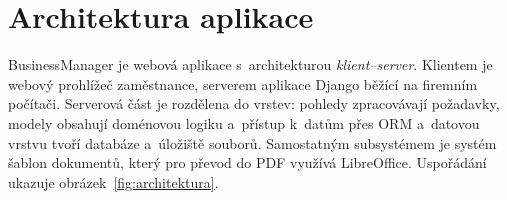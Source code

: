 \section{Architektura aplikace}\label{sec:architektura}

BusinessManager je webová aplikace s~architekturou \emph{klient--server}. Klientem je webový prohlížeč zaměstnance, serverem aplikace Django běžící na firemním počítači. Serverová část je rozdělena do vrstev: pohledy zpracovávají požadavky, modely obsahují doménovou logiku a~přístup k~datům přes ORM a~datovou vrstvu tvoří databáze a~úložiště souborů. Samostatným subsystémem je systém šablon dokumentů, který pro převod do PDF využívá LibreOffice. Uspořádání ukazuje obrázek~\ref{fig:architektura}.

